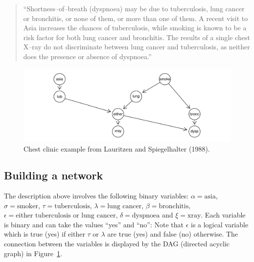 \documentclass[10pt]{article}\usepackage[]{graphicx}\usepackage[]{xcolor}
\makeatletter
\def\maxwidth{ %
  \ifdim\Gin@nat@width>\linewidth
    \linewidth
  \else
    \Gin@nat@width
  \fi
}
\newenvironment{knitrout}{}{} %
\makeatother
\begin{document}
\begin{quote}
  ``Shortness--of--breath (dyspnoea) may be due to tuberculosis, lung
  cancer or bronchitis, or none of them, or more than one of them. A
  recent visit to Asia increases the chances of tuberculosis, while
  smoking is known to be a risk factor for both lung cancer and
  bronchitis. The results of a single chest X--ray do not discriminate
  between lung cancer and tuberculosis, as neither does the presence or
  absence of dyspnoea.''
\end{quote}


\begin{knitrout}
\color{fgcolor}\begin{figure}
\includegraphics[width=\maxwidth]{figures/grain-chest-LS-1} \caption[Chest clinic example from Lauritzen and Spiegelhalter (1988)]{Chest clinic example from Lauritzen and Spiegelhalter (1988).}\label{fig:chest-LS}
\end{figure}

\end{knitrout}

\subsection{Building a network}

The description above involves the following binary variables:
$\alpha=\mbox{asia}$,
$\sigma=\mbox{smoker}$,
$\tau=\mbox{tuberculosis}$,
$\lambda=\mbox{lung cancer}$,
$\beta=\mbox{bronchitis}$,
$\epsilon=\mbox{either tuberculosis or lung cancer}$,
$\delta=\mbox{dyspnoea}$ and
$\xi=\mbox{xray}$. 
Each variable is binary and can take the values ``yes'' and ``no'':
Note that $\epsilon$ is a logical variable which is
true (yes) if either $\tau$ or $\lambda$ are true (yes) and false (no) otherwise.
The connection between the variables is displayed by the DAG (directed acyclic graph) in
Figure~\ref{fig:chest-LS}.
\end{document}
